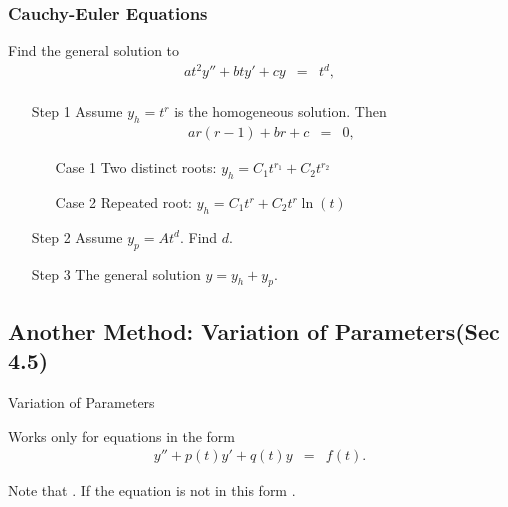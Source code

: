 \begin{frame}
  \frametitle{Cauchy-Euler Equations}

  Find the general solution to
  {\color{red}\begin{eqnarray*}
    a t^2 y''+ bt y' + c y  & = & t^d, \\
  \end{eqnarray*}}

  \begin{enumerate}
    \item[Step 1] Assume {\color{blue}$y_h=t^r$} is the homogeneous solution. Then
    \begin{eqnarray*}
      ar(r-1) +br + c & = & 0,
    \end{eqnarray*}
    \vspace{-0.5cm}
    \begin{enumerate}
    \item[Case 1] Two distinct roots:
           {\color{orange}$y_h=C_1t^{r_1}+C_2t^{r_2}$}
    \item[Case 2] Repeated root:
            {\color{orange}$y_h=C_1t^{r}+C_2t^{r}\ln(t)$ }
    \end{enumerate}

    \item[Step 2] Assume {\color{blue}$y_p=At^d$}. Find $d$.
    \item[Step 3] The general solution {\color{red}$y=y_h+y_p$}.
   \end{enumerate}



\end{frame}


\subsection{Another Method: Variation of Parameters(Sec 4.5)}

\begin{frame}{Variation of Parameters}

  Works only for equations in the form
  \begin{eqnarray}\label{eqn1}
    y'' + p(t) y' + q(t) y & = & f(t).
  \end{eqnarray}

  Note that . If the
  equation is not in this form .

\end{frame}

